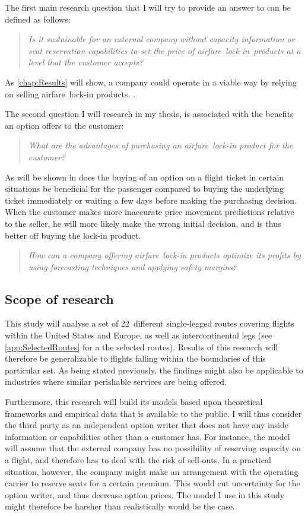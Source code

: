 The first main research question that I will try to provide an answer to can be defined as follows:

\begin{quote}\emph{Is it sustainable for an external company without capacity information or seat reservation capabilities to set the price of airfare~lock-in~products at a level that the customer accepts?}\end{quote}

As \autoref{chap:Results} will show, a company could operate in a viable way by relying on selling airfare~lock-in products. .

The second question I will research in my thesis, is associated with the benefits an option offers to the customer:

\begin{quote}\emph{What are the advantages of purchasing an airfare~lock-in product for the customer?}\end{quote}

As will be shown in  does the buying of an option on a flight ticket in certain situations be beneficial for the passenger compared to buying the underlying ticket immediately or waiting a few days before making the purchasing decision. When the customer makes more inaccurate price movement predictions relative to the seller, he will more likely make the wrong initial decision, and is thus better off buying the lock-in product.


\begin{quote}\emph{How can a company offering airfare~lock-in products optimize its profits by using forecasting techniques and applying safety margins?}\end{quote}


\subsection{Scope of research}
This study will analyse a set of 22~different single-legged routes covering flights within the United States and Europe, as well as intercontinental legs (see \autoref{app:SelectedRoutes} for a the selected routes). Results of this research will therefore be generalizable to flights falling within the boundaries of this particular set. As being stated previously, the findings might also be applicable to industries where similar perishable services are being offered.

Furthermore, this research will build its models based upon theoretical frameworks and empirical data that is available to the public. I will thus consider the third party as an independent option writer that does not have any inside information or capabilities other than a customer has. For instance, the model will assume that the external company has no possibility of reserving capacity on a flight, and therefore has to deal with the risk of sell-outs. In a practical situation, however, the company might make an arrangement with the operating carrier to reserve seats for a certain premium. This would cut uncertainty for the option writer, and thus decrease option prices. The model I use in this study might therefore be harsher than realistically would be the case.



